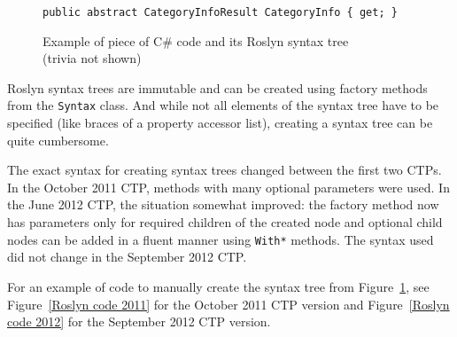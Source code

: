 \begin{figure}[htbp]

\begin{lstlisting}
public abstract CategoryInfoResult CategoryInfo { get; }
\end{lstlisting}

\begin{center}
\end{center}

\caption[Example of piece of C\# code and its Roslyn syntax tree]
{Example of piece of C\# code and its Roslyn syntax tree \\ (trivia not shown)}
\label{Syntax tree}
\end{figure}

Roslyn syntax trees are immutable and can be created using factory methods from the \lstinline{Syntax} class.
And while not all elements of the syntax tree have to be specified (like braces of a property accessor list),
creating a syntax tree can be quite cumbersome.

The exact syntax for creating syntax trees changed between the first two \acp{CTP}.
In the October 2011 \ac{CTP}, methods with many optional parameters were used.
In the June 2012 \ac{CTP}, the situation somewhat improved:
the factory method now has parameters only for required children of the created node
and optional child nodes can be added in a fluent manner using \lstinline{With*} methods.
The syntax used did not change in the September 2012 \ac{CTP}.

For an example of code to manually create the syntax tree from Figure~\ref{Syntax tree},
see Figure~\ref{Roslyn code 2011} for the October 2011 \ac{CTP} version and
Figure~\ref{Roslyn code 2012} for the September 2012 \ac{CTP} version.

